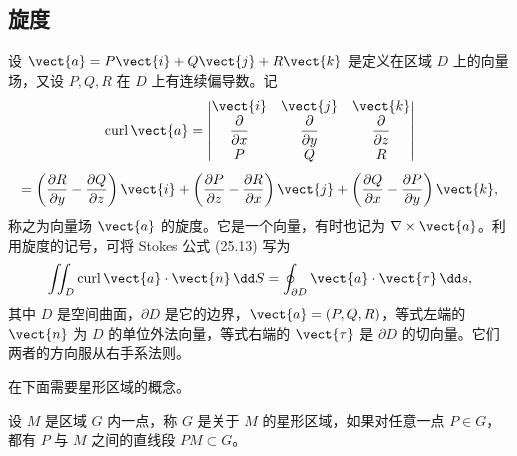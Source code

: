 \subsection{旋度}

设 $\vect{a}=P\vect{i}+Q\vect{j}+R\vect{k}$ 是定义在区域 $D$ 上的向量场，又设 $P,Q,R$ 在 $D$ 上有连续偏导数。记
\[
  \operatorname{curl}\vect{a}
  =\begin{vmatrix}
    \vect{i}&\vect{j}&\vect{k}\\
    \dfrac{\partial}{\partial x}&\dfrac{\partial}{\partial y}&\dfrac{\partial}{\partial z}\\
    P&Q&R
  \end{vmatrix}
\]
\[
  =\left(\frac{\partial R}{\partial y}-\frac{\partial Q}{\partial z}\right)\vect{i}
  +\left(\frac{\partial P}{\partial z}-\frac{\partial R}{\partial x}\right)\vect{j}
  +\left(\frac{\partial Q}{\partial x}-\frac{\partial P}{\partial y}\right)\vect{k},
\]
称之为向量场 $\vect{a}$ 的旋度。它是一个向量，有时也记为 $\nabla\times\vect{a}$。利用旋度的记号，可将 Stokes 公式 (25.13) 写为
\[
  \iint_D \operatorname{curl}\vect{a}\cdot\vect{n}\,\dd S
  =\oint_{\partial D}\vect{a}\cdot\vect{\tau}\,\dd s,
\]
其中 $D$ 是空间曲面，$\partial D$ 是它的边界，$\vect{a}=(P,Q,R)$，等式左端的 $\vect{n}$ 为 $D$ 的单位外法向量，等式右端的 $\vect{\tau}$ 是 $\partial D$ 的切向量。它们两者的方向服从右手系法则。

在下面需要星形区域的概念。

\begin{xdefinition}
设 $M$ 是区域 $G$ 内一点，称 $G$ 是关于 $M$ 的星形区域，如果对任意一点 $P\in G$，都有 $P$ 与 $M$ 之间的直线段 $PM\subset G$。
\end{xdefinition}

